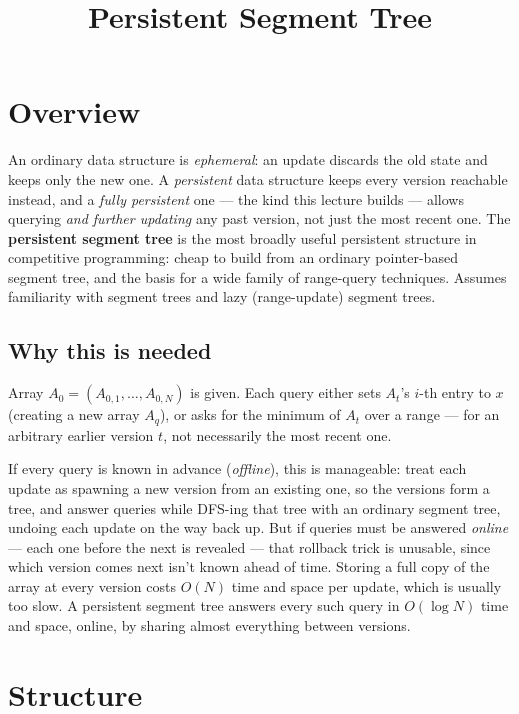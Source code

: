 \documentclass[11pt]{article}
\title{Persistent Segment Tree}
\author{}
\date{}
\begin{document}
\thispagestyle{fancy}


\section{Overview}
An ordinary data structure is \emph{ephemeral}: an update discards the old
state and keeps only the new one. A \emph{persistent} data structure keeps
every version reachable instead, and a \emph{fully persistent} one --- the
kind this lecture builds --- allows querying \emph{and further updating}
any past version, not just the most recent one. The \textbf{persistent
segment tree} is the most broadly useful persistent structure in
competitive programming: cheap to build from an ordinary pointer-based
segment tree, and the basis for a wide family of range-query techniques.
Assumes familiarity with segment trees and lazy (range-update) segment
trees.

\subsection{Why this is needed}
\begin{definitionbox}
Array $A_0 = (A_{0,1}, \ldots, A_{0,N})$ is given. Each query either sets
$A_t$'s $i$-th entry to $x$ (creating a new array $A_q$), or asks for the
minimum of $A_t$ over a range --- for an arbitrary earlier version $t$, not
necessarily the most recent one.
\end{definitionbox}

If every query is known in advance (\emph{offline}), this is manageable:
treat each update as spawning a new version from an existing one, so the
versions form a tree, and answer queries while DFS-ing that tree with an
ordinary segment tree, undoing each update on the way back up. But if
queries must be answered \emph{online} --- each one before the next is
revealed --- that rollback trick is unusable, since which version comes
next isn't known ahead of time. Storing a full copy of the array at every
version costs $O(N)$ time and space per update, which is usually too slow.
A persistent segment tree answers every such query in $O(\log N)$ time and
space, online, by sharing almost everything between versions.

\section{Structure}
\end{document}
